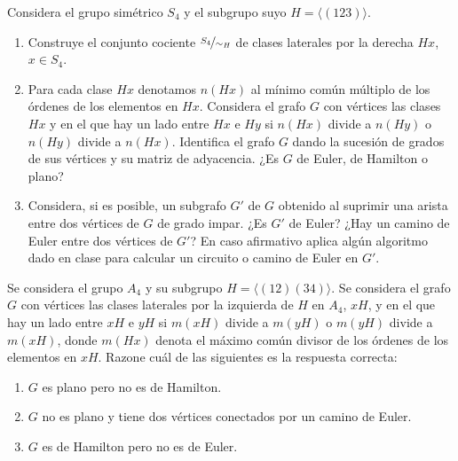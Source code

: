\begin{ejercicio}\label{ej:1.37}
    Considera el grupo simétrico $S_4$ y el subgrupo suyo $H = \langle (1 2 3) \rangle$.
    \begin{enumerate}
        \item Construye el conjunto cociente $\nicefrac{S_4}{\sim_H}$ de clases laterales por la derecha $Hx$, $x \in S_4$.
        \item Para cada clase $Hx$ denotamos $n(Hx)$ al mínimo común múltiplo de los órdenes de los elementos en $Hx$. Considera el grafo $G$ con vértices las clases $Hx$ y en el que hay un lado entre $Hx$ e $Hy$ si $n(Hx)$ divide a $n(Hy)$ o $n(Hy)$ divide a $n(Hx)$. Identifica el grafo $G$ dando la sucesión de grados de sus vértices y su matriz de adyacencia. ¿Es $G$ de Euler, de Hamilton o plano?
        \item Considera, si es posible, un subgrafo $G'$ de $G$ obtenido al suprimir una arista entre dos vértices de $G$ de grado impar. ¿Es $G'$ de Euler? ¿Hay un camino de Euler entre dos vértices de $G'$? En caso afirmativo aplica algún algoritmo dado en clase para calcular un circuito o camino de Euler en $G'$.
    \end{enumerate}
\end{ejercicio}

\begin{ejercicio}\label{ej:1.38}
    Se considera el grupo $A_4$ y su subgrupo $H = \langle (1 2)(3 4) \rangle$. Se considera el grafo $G$ con vértices las clases laterales por la izquierda de $H$ en $A_4$, $xH$, y en el que hay un lado entre $xH$ e $yH$ si $m(xH)$ divide a $m(yH)$ o $m(yH)$ divide a $m(xH)$, donde $m(Hx)$ denota el máximo común divisor de los órdenes de los elementos en $xH$.
    Razone cuál de las siguientes es la respuesta correcta:
    \begin{enumerate}
        \item $G$ es plano pero no es de Hamilton.
        \item $G$ no es plano y tiene dos vértices conectados por un camino de Euler.
        \item $G$ es de Hamilton pero no es de Euler.
    \end{enumerate}
\end{ejercicio}


